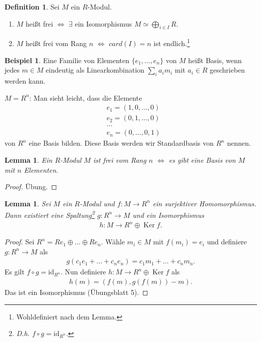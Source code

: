 \documentclass[reqno,12pt]{article}
\numberwithin{equation}{section}
\newcommand{\iso}{\simeq}
\newcommand{\id}{\text{id}}
\newcommand{\Ker}{\text{Ker }}
\theoremstyle{plain}
\newtheorem{lemma}[thm]{Lemma}
\theoremstyle{definition}
\newtheorem{definition}[thm]{Definition}
\newtheorem{example}[thm]{Beispiel}
\renewcommand{\Ker}{\operatorname{Ker}}
\begin{document}
\begin{definition}
Sei $M$ ein $R$-Modul.
\begin{enumerate}
  \item $M$ heißt {\sf frei} $\iff$  $\exists$ ein Isomorphismus $M \iso \bigoplus_{i \in I} R$.

  \item $M$ heißt {\sf frei vom Rang $n$} $\iff$ $card(I)=n$ ist endlich.\footnote{Wohldefiniert nach dem Lemma.}
\end{enumerate}
\end{definition}

\begin{example}
Eine Familie von Elementen $\{e_1, \dots, e_n \}$ von $M$ heißt {\sf Basis}, wenn jedes $m \in M$ eindeutig als Linearkombination $\sum_i a_i m_i$ mit $a_i \in R$ geschrieben werden kann.

\medskip

\noindent $M=R^n$: Man sieht leicht, dass die Elemente
\begin{align*}
& e_1 = (1,0, \dots, 0) \\
& e_2 = (0,1, \dots, 0) \\
& \dots \\
& e_n = (0, \dots, 0,1)
\end{align*}
von $R^n$ eine Basis bilden. Diese Basis werden wir {\sf Standardbasis} von $R^n$ nennen.
\end{example}


\begin{lemma}
Ein $R$-Modul $M$ ist frei vom Rang $n$ $\iff$ es gibt eine Basis von $M$ mit $n$ Elementen.
\end{lemma}

\begin{proof}
Übung.
\end{proof}

\begin{lemma}
  Sei $M$ ein $R$-Modul und $f \colon M \to R^n$ ein surjektiver Homomorphismus. Dann existiert eine Spaltung\footnote{D.h. $f \circ g = \id_{R^n}$.} $g \colon R^n \to M$ und ein Isomorphismus
  \begin{align*}
  h \colon M \to R^n \oplus \Ker f.
  \end{align*}
\end{lemma}

\begin{proof}
  Sei $R^n = R e_1 \oplus \dots \oplus R e_n$. Wähle $m_i \in M$ mit $f(m_i) = e_i$ und definiere $g \colon R^n \to M$ als
  \begin{align*}
  g(c_1e_1 + \dots + c_n e_n) = c_1 m_1 + \dots + c_n m_n.
  \end{align*}
  Es gilt  $f \circ g = \id_{R^n}$. Nun definiere $h \colon M \to R^n \oplus \Ker f$ als
  \begin{align*}
  h(m) = (f(m), g(f(m)) - m).
  \end{align*}
  Das ist ein Isomorphismus (Übungsblatt 5).
\end{proof}
\end{document}
